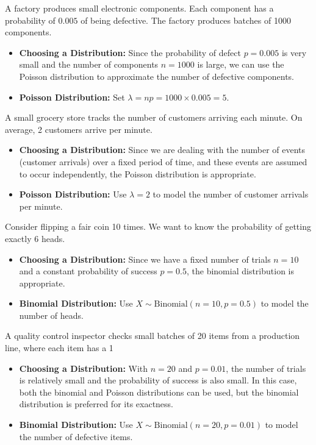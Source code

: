 \begin{example}
    A factory produces small electronic components. Each component has a probability of \(0.005\) of being defective. The factory produces batches of 1000 components. 
\begin{itemize}
    \item \textbf{Choosing a Distribution:} Since the probability of defect \(p = 0.005\) is very small and the number of components \(n = 1000\) is large, we can use the Poisson distribution to approximate the number of defective components.
    \item \textbf{Poisson Distribution:} Set \(\lambda = np = 1000 \times 0.005 = 5\).
\end{itemize}
\end{example}

\begin{example}
    A small grocery store tracks the number of customers arriving each minute. On average, 2 customers arrive per minute.
\begin{itemize}
    \item \textbf{Choosing a Distribution:} Since we are dealing with the number of events (customer arrivals) over a fixed period of time, and these events are assumed to occur independently, the Poisson distribution is appropriate.
    \item \textbf{Poisson Distribution:} Use \(\lambda = 2\) to model the number of customer arrivals per minute.
\end{itemize}
\end{example}

\begin{example}
    Consider flipping a fair coin 10 times. We want to know the probability of getting exactly 6 heads.
\begin{itemize}
    \item \textbf{Choosing a Distribution:} Since we have a fixed number of trials \(n = 10\) and a constant probability of success \(p = 0.5\), the binomial distribution is appropriate.
    \item \textbf{Binomial Distribution:} Use \(X \sim \text{Binomial}(n=10, p=0.5)\) to model the number of heads.
\end{itemize}
\end{example}

\begin{example}
    A quality control inspector checks small batches of 20 items from a production line, where each item has a 1%
\begin{itemize}
    \item \textbf{Choosing a Distribution:} With \(n = 20\) and \(p = 0.01\), the number of trials is relatively small and the probability of success is also small. In this case, both the binomial and Poisson distributions can be used, but the binomial distribution is preferred for its exactness.
    \item \textbf{Binomial Distribution:} Use \(X \sim \text{Binomial}(n=20, p=0.01)\) to model the number of defective items.
\end{itemize}
\end{example}

